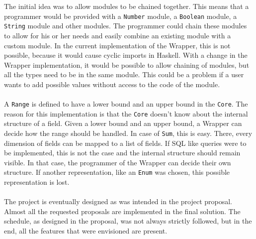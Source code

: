 \documentclass{article}
\begin{document}
The initial idea was to allow modules to be chained together. This means that a programmer would be provided with a \texttt{Number} module, a \texttt{Boolean} module, a \texttt{String} module and other modules. The programmer could chain these modules to allow for his or her needs and easily combine an existing module with a custom module. In the current implementation of the Wrapper, this is not possible, because it would cause cyclic imports in Haskell. With a change in the Wrapper implementation, it would be possible to allow chaining of modules, but all the types need to be in the same module. This could be a problem if a user wants to add possible values without access to the code of the module.
\\\\
A \texttt{Range} is defined to have a lower bound and an upper bound in the \texttt{Core}. The reason for this implementation is that the \texttt{Core} doesn't know about the internal structure of a field. Given a lower bound and an upper bound, a Wrapper can decide how the range should be handled. In case of \texttt{Sum}, this is easy. There, every dimension of fields can be mapped to a list of fields. If SQL like queries were to be implemented, this is not the case and the internal structure should remain visible. In that case, the programmer of the Wrapper can decide their own structure. If another representation, like an \texttt{Enum} was chosen, this possible representation is lost.
\\\\
The project is eventually designed as was intended in the project proposal. Almost all the requested proposals are implemented in the final solution. The schedule, as designed in the proposal, was not always strictly followed, but in the end, all the features that were envisioned are present.

	
\end{document}
